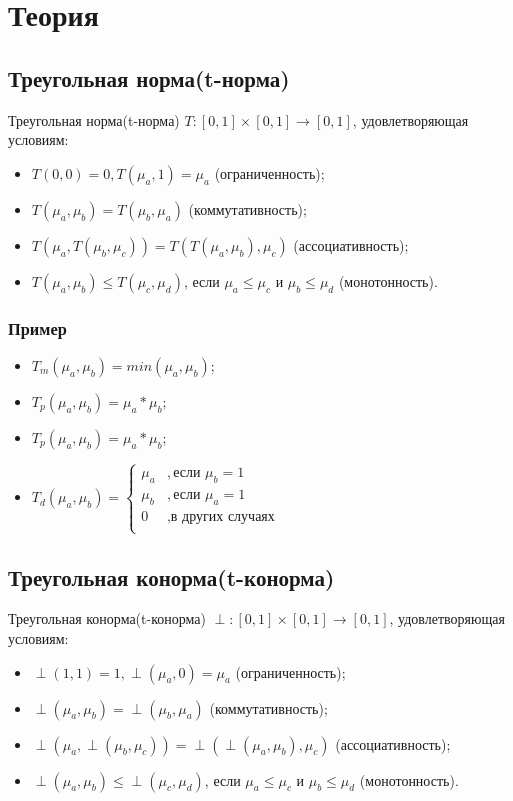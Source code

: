 \documentclass[12pt]{article}
\begin{document}
\section{Теория}
\subsection{Треугольная норма(t-норма)}

Треугольная норма(t-норма) $T:[0, 1]\times[0, 1]\rightarrow[0, 1]$, удовлетворяющая условиям:

\begin{itemize}
    \item $T(0, 0) = 0, T(\mu_a, 1) = \mu_a$ (ограниченность);
    \item $T(\mu_a, \mu_b) = T(\mu_b, \mu_a)$ (коммутативность);
    \item $T(\mu_a, T(\mu_b, \mu_c)) = T(T(\mu_a, \mu_b), \mu_c)$ (ассоциативность);
    \item $T(\mu_a, \mu_b)\le T(\mu_c, \mu_d)$, если $\mu_a\le\mu_c$ и $\mu_b\le\mu_d$ (монотонность).
\end{itemize}

\subsubsection{Пример}
\begin{itemize}
    \item $T_m(\mu_a, \mu_b) = min(\mu_a, \mu_b)$;
    \item $T_p(\mu_a, \mu_b) = \mu_a*\mu_b$;
    \item $T_p(\mu_a, \mu_b) = \mu_a*\mu_b$;
    \item $T_d(\mu_a, \mu_b) =
\begin{cases}
\mu_a &, \text{если }\mu_b=1\\
\mu_b &, \text{если }\mu_a=1\\
0 &,  \text{в других случаях}\\
\end{cases}$
\end{itemize}

\subsection{Треугольная конорма(t-конорма)}

Треугольная конорма(t-конорма) $\perp:[0, 1]\times[0, 1]\rightarrow[0, 1]$, удовлетворяющая условиям:

\begin{itemize}
    \item $\perp(1, 1) = 1, \perp(\mu_a, 0) = \mu_a$ (ограниченность);
    \item $\perp(\mu_a, \mu_b) = \perp(\mu_b, \mu_a)$ (коммутативность);
    \item $\perp(\mu_a, \perp(\mu_b, \mu_c)) = \perp(\perp(\mu_a, \mu_b), \mu_c)$ (ассоциативность);
    \item $\perp(\mu_a, \mu_b)\le \perp(\mu_c, \mu_d)$, если $\mu_a\le\mu_c$ и $\mu_b\le\mu_d$ (монотонность).
\end{itemize}
\end{document}
